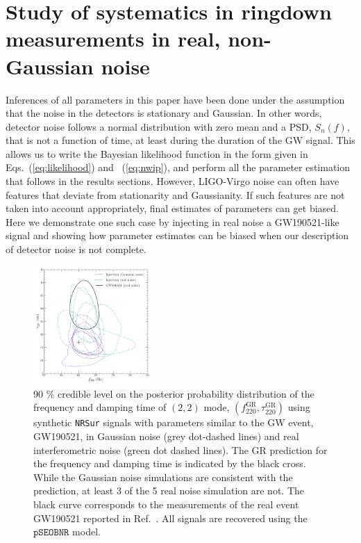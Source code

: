 \documentclass[twocolumn,prd,aps,superscriptaddress,preprintnumbers,tightenlines,showpacs,nofootinbib,eqsecnum,amsfonts,amsmath]{revtex4-1}
\newcommand{\fgr}[1]{f ^{\text{GR}}_{\text{#1}}}
\newcommand{\taugr}[1]{\tau ^{\text{GR}}_{\text{#1}}}
\newcommand{\pSEOB}{\texttt{pSEOBNR}}
\begin{document}
\appendix
\section{Study of systematics in ringdown measurements in real, non-Gaussian noise}\label{sec:noise_systematics}


Inferences of all parameters in this paper have been done under the
assumption that the noise in the detectors is stationary and
Gaussian. In other words, detector noise follows a normal distribution
with zero mean and a PSD, $S_n(f)$, that is not a function of time, at
least during the duration of the GW signal. This
allows us to write the Bayesian likelihood function in the form given
in Eqs.~(\ref{eq:likelihood}) and ~(\ref{eq:nwip}), and perform all the
parameter estimation that follows in the results sections. However,
LIGO-Virgo noise can often have features that deviate from
stationarity and Gaussianity. If such features are not taken into
account appropriately, final estimates of parameters can get
biased. Here we demonstrate one such case by injecting in real noise a
GW190521-like signal and showing how parameter estimates can be biased
when our description of detector noise is not complete.

\begin{figure}
\begin{center}
        \includegraphics[width=0.4\textwidth]{figures/S190521g_swinjs.png}
        \caption{90 \% credible level on the posterior probability distribution of the frequency and damping time of $(2, 2)$ mode, $(\fgr{220}, \taugr{220})$ using synthetic \texttt{NRSur} signals with parameters similar to the GW event, GW190521, in Gaussian noise (grey dot-dashed lines) and real interferometric noise (green dot dashed lines). The GR prediction for the frequency and damping time is indicated by the black cross. While the Gaussian noise simulations are consistent with the prediction, at least 3 of the 5 real noise simulation are not. The black curve corresponds to the measurements of the real event GW190521 reported in Ref.~\cite{Abbott:2020jks}. All signals are recovered using the $\pSEOB$ model.}
        \label{fig:21g_systematics}
\end{center}
\end{figure}
\end{document}
